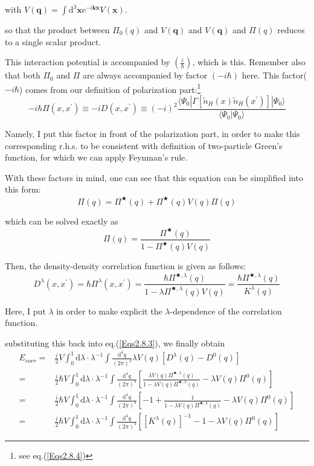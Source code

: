 with $V(\mathbf{q})=\int \mathrm{d}^3 \mathbf{x} \mathrm{e}^{-i \mathbf{k} \mathbf{x}} V(\mathbf{x})$.

so that the product between $\Pi_0(q)$ and $V(\mathbf{q})$ and $V(\mathbf{q})$ and $\Pi(q)$ reduces to a single scalar product.

This interaction potential is accompanied by $\left( \frac{i}{\hbar} \right)$, which is this. Remember also that both $\Pi_0$ and $\Pi$ are always accompanied by factor $(-i \hbar)$ here.
This factor($-i \hbar$) comes from our definition of polarization part:\footnote{see eq.(\ref{Eqs2.8.4})}
\[-i \hbar \Pi(x,x^{'})\equiv -i D(x,x^{'}) \equiv (-i)^2 \frac{\langle \Psi_0 | \Gamma[\tilde{n}_H(x)\tilde{n}_H(x^{'})]|\Psi_0\rangle}{\langle\Psi_0|\Psi_0\rangle}\]

Namely, I put this factor in front of the polarization part, in order to make this corresponding r.h.s. to be consistent with definition of two-particle Green's function, for which we can apply Feynman's rule.

With these factors in mind, one can see that this equation can be simplified into this form:
\begin{equation} \label{Eqs2.8.5}
\Pi(q) = \Pi^{\bigstar}(q)+\Pi^{\bigstar}(q) V(q) \Pi(q)
\end{equation}

which can be solved exactly as
\begin{equation*} \label{Eqs2.8.5'} \tag{2.8.5'} \Pi(q) = \frac{\Pi^{\bigstar}(q)}{1-\Pi^{\bigstar}(q) V(q)} \end{equation*}

Then, the density-density correlation function is given as follows:
\begin{equation} \label{Eqs2.8.6}
D^{\lambda}(x,x^{'}) = \hbar \Pi^{\lambda}(x,x^{'}) = \frac{\hbar \Pi^{\bigstar,\lambda}(q)}{1-\lambda\Pi^{\bigstar,\lambda}(q) V(q)} = \frac{\hbar \Pi^{\bigstar,\lambda}(q)}{K^{\lambda}(q)}
\end{equation}

Here, I put $\lambda$ in order to make explicit the $\lambda$-dependence of the correlation function.

substituting this back into eq.(\ref{Eqs2.8.3}), we finally obtain
\begin{eqnarray}
E_{corr} =& \frac{i}{2} V \int_0^1 \mathrm{d}\lambda \cdot \lambda^{-1} \int \frac{\mathrm{d}^4 q}{(2\pi)^4} \lambda V(q) [D^{\lambda}(q)-D^0(q)]\nonumber\\
=& \frac{i}{2} \hbar V \int_0^1 \mathrm{d}\lambda \cdot \lambda^{-1} \int \frac{\mathrm{d}^4 q}{(2\pi)^4} \left[ \frac{\lambda V(q)\Pi^{\bigstar,\lambda}(q)}{1-\lambda V(q)\Pi^{\bigstar,\lambda}(q)} - \lambda V(q)\Pi^0(q) \right] \label{Eqs2.8.7}\\
=& \frac{i}{2} \hbar V \int_0^1 \mathrm{d}\lambda \cdot \lambda^{-1} \int \frac{\mathrm{d}^4 q}{(2\pi)^4} \left[ -1 + \frac{1}{1-\lambda V(q)\Pi^{\bigstar,\lambda}(q)} - \lambda V(q)\Pi^0(q) \right] \nonumber\\
=&\frac{i}{2} \hbar V \int_0^1 \mathrm{d}\lambda \cdot \lambda^{-1} \int \frac{\mathrm{d}^4 q}{(2\pi)^4} \left[ \left[ K^{\lambda}(q) \right]^{-1} - 1 - \lambda V(q)\Pi^0(q) \right] \label{Eqs2.8.8}
\end{eqnarray}

